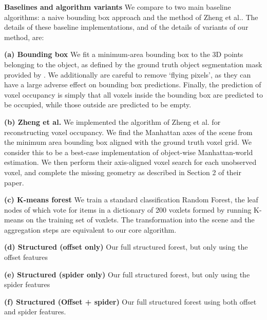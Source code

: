 \documentclass[10pt,twocolumn,letterpaper]{article}
\makeatletter
\newcommand*{\ea}{et al.\@\xspace}
\renewcommand{\paragraph}{\vspace{2pt}\noindent\textbf}
\makeatother
\begin{document}
\paragraph{Baselines and algorithm variants}
\label{sec:algorithms}
We compare to two main baseline algorithms: a naive bounding box approach and the method of Zheng \ea \cite{zheng-cvpr-2013}.
The details of these baseline implementations, and of the details of variants of our method, are:

\noindent \textbf{(a) Bounding box} We fit a minimum-area bounding box to the 3D points belonging to the object, as defined by the ground truth object segmentation mask provided by \cite{singh-icra-2014}.
We additionally are careful to remove `flying pixels', as they can have a large adverse effect on bounding box predictions.
Finally, the prediction of voxel occupancy is simply that all voxels inside the bounding box are predicted to be occupied, while those outside are predicted to be empty.

\noindent \textbf{(b) Zheng \ea} \cite{zheng-cvpr-2013}
We implemented the algorithm of Zheng \ea \cite{zheng-cvpr-2013} for reconstructing voxel occupancy.
We find the Manhattan axes of the scene from the minimum area bounding box aligned with the ground truth voxel grid. 
We consider this to be a best-case implementation of object-wise Manhattan-world estimation.
We then perform their axis-aligned voxel search for each unobserved voxel, and complete the missing geometry as described in Section 2 of their paper.


\noindent \textbf{(c) K-means forest} We train a standard classification Random Forest, the leaf nodes of which vote for items in a dictionary of 200 voxlets formed by running K-means on the training set of voxlets. The transformation into the scene and the aggregation steps are equivalent to our core algorithm.

\noindent \textbf{(d) Structured (offset only)} Our full structured forest, but only using the offset features

\noindent \textbf{(e) Structured (spider only)} Our full structured forest, but only using the spider features

\noindent \textbf{(f) Structured (Offset + spider)}  Our full structured forest using both offset and spider features.

\vspace{10pt}
\end{document}
